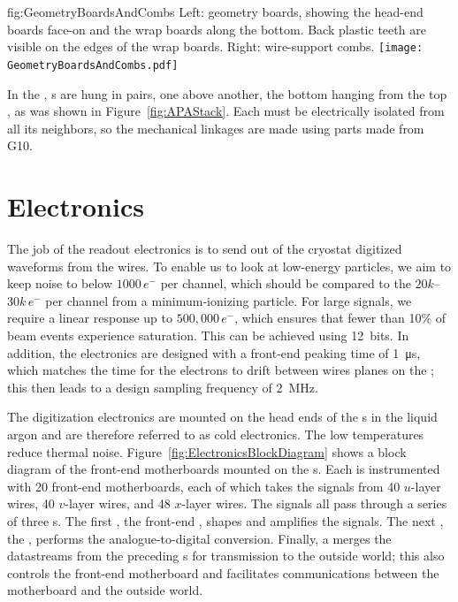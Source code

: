 \begin{dunefigure}{fig:GeometryBoardsAndCombs}
{Left: geometry boards, showing the head-end boards face-on and the wrap boards along the bottom. Back plastic teeth are visible on the edges of the wrap boards. Right: wire-support combs.}
\texttt{[image: GeometryBoardsAndCombs.pdf]}
\end{dunefigure}

In the , s are hung in pairs, one above another, the bottom  hanging from the top , as was shown in Figure~\ref{fig:APAStack}. Each  must be electrically isolated from all its neighbors, so the mechanical linkages are made using parts made from G10.

\section{Electronics}
\label{sec:fdsp-exec-electronics}

The job of the readout electronics is to send out of the cryostat digitized waveforms from the  wires. To enable us to look at low-energy particles, we aim to keep noise to below $1000\,e^{-}$ per channel, which should be compared to the $20k$--$30k\,e^{-}$ per channel from a minimum-ionizing particle. For large signals, we require a linear response up to $500,000\,e^{-}$, which ensures that fewer than 10\% of beam events experience saturation. This can be achieved using 12\,  bits. In addition, the electronics are designed with a front-end peaking time of \SI{1}{\micro\second}, which matches the time for the electrons to drift between wires planes on the ; this then leads to a design sampling frequency of \SI{2}{\mega\hertz}.

The digitization electronics are mounted on the head ends of the s in the liquid argon and are therefore referred to as cold electronics. The low temperatures reduce thermal noise. Figure~\ref{fig:ElectronicsBlockDiagram} shows a block diagram of the front-end motherboards mounted on the s. Each  is instrumented with 20 front-end motherboards, each of which takes the signals from 40 $u$-layer wires, 40 $v$-layer wires, and 48 $x$-layer wires. The signals all pass through a series of three s. The first , the front-end , shapes and amplifies the signals. The next , the  , performs the analogue-to-digital conversion. Finally, a   merges the datastreams from the preceding s for transmission to the outside world; this   also controls the front-end motherboard and facilitates communications between the motherboard and the outside world.

